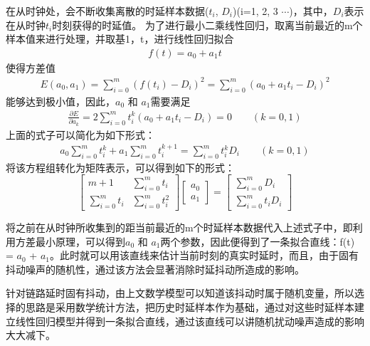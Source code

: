 在从时钟处，会不断收集离散的时延样本数据($t_{i}$, $D_{i}$)(i=1, 2, 3 $\cdots$)，其中，$D_{i}$表示在从时钟$t_{i}$时刻获得的时延值。
为了进行最小二乘线性回归，取离当前最近的m个样本值来进行处理，并取基1，t，进行线性回归拟合
\begin {align}
f(t) = a_{0} + a_{1}t
\end{align}
使得方差值
\begin{align}
E(a_{0}, a_{1}) = \sum_{i=0}^{m}(f(t_{i}) - D_{i})^{2}
	= \sum_{i=0}^{m}(a_{0} + a_{1}t_{i} - D_{i})^{2}
\end{align}
能够达到极小值，因此，$a_{0}$ 和 $a_{1}$需要满足
\begin{align}
	\frac{\partial E}{\partial a_{k}} = 2 \sum_{i=0}^{m}t_{i}^{k}(a_{0} + a_{1}t_{i} - D_{i}) = 0
	\qquad(k = 0, 1)
\end{align}
上面的式子可以简化为如下形式：
\begin{align}
	a_{0}\sum_{i=0}^{m}t_{i}^{k} + a_{1}\sum_{i=0}^{m}t_{i}^{k+1} = \sum_{i=0}^{m}t_{i}^{k}D_{i}
	\qquad(k = 0, 1)
\end{align}
将该方程组转化为矩阵表示，可以得到如下的形式：
\begin{equation}
	\begin{bmatrix}
		m+1 & \sum_{i=0}^{m}t_{i} \\ 
		\sum_{i=0}^{m}t_{i} & \sum_{i=0}^{m}t_{i}^{2}
	\end{bmatrix}
	\begin{bmatrix}
	a_{0} \\ a_{1}
	\end{bmatrix}
	=
	\begin{bmatrix}
	 \sum_{i=0}^{m}D_{i} \\ \sum_{i=0}^{m}t_{i}D_{i}
	\end{bmatrix}
\end{equation}

将之前在从时钟所收集到的距当前最近的m个时延样本数据代入上述式子中，即利用方差最小原理，可以得到$a_{0}$ 和 $a_{1}$两个参数，因此便得到了一条拟合直线：f(t) = $a_{0}$ + $a_{1}$。此时就可以用该直线来估计当前时刻的真实时延时，而且，由于固有抖动噪声的随机性，通过该方法会显著消除时延抖动所造成的影响。

针对链路延时固有抖动，由上文数学模型可以知道该抖动时属于随机变量，所以选择的思路是采用数学统计方法，把历史时延样本作为基础，通过对这些时延样本建立线性回归模型并得到一条拟合直线，通过该直线可以讲随机扰动噪声造成的影响大大减下。

